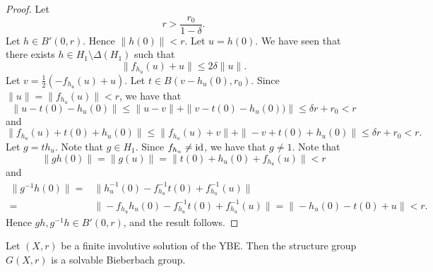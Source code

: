 \begin{proof}
Let 
\[ r> \frac{r_0}{1-\delta}.\]
Let $h\in B'(0,r)$. Hence $\|h(0)\|<r$.
Let $u=h(0)$. We have seen that there exists $h\in H_1\setminus \Delta(H_1)$ such that
\[ \|f_{h_u}(u)+u\|\leq 2\delta\| u\|.\]
Let $v=\frac{1}{2}(-f_{h_u}(u)+u)$. Let $t\in B(v-h_u(0),r_0)$. Since $\| u\|=\|f_{h_u}(u)\|<r$, we have that
\[ \| u-t(0)-h_u(0)\|\leq \|u-v\|+\|v-t(0)-h_u(0))\|\leq\delta r+r_0<r\]
and
\[ \| f_{h_u}(u)+t(0)+h_u(0)\|\leq \|f_{h_u}(u)+v\|+\|-v+t(0)+h_u(0)\|\leq\delta r+r_0<r.\]
Let $g=th_u$. Note that $g\in H_1$. Since $f_{h_u}\neq \operatorname{id}$, we have that $g\neq 1$.
Note that
\[    \|gh(0)\|=\|g(u)\|=\|t(0)+h_u(0)+f_{h_u}(u)\|<r
\]
and
\begin{align*}    \|g^{-1}h(0)\|=&\|h_u^{-1}(0)-f_{h_u}^{-1}t(0)+f_{h_u}^{-1}(u)\|\\
=&\|-f_{h_u}h_u(0)-f_{h_u}^{-1}t(0)+f_{h_u}^{-1}(u)\|=\|-h_u(0)-t(0)+u\|<r.
\end{align*}
Hence $gh,g^{-1}h\in B'(0,r)$, and the result follows.
\end{proof}

\begin{theorem}\label{thm:finiteinvol}
Let $(X,r)$ be a finite involutive solution of the YBE. Then the structure group $G(X,r)$ is a solvable Bieberbach group.
\end{theorem}

